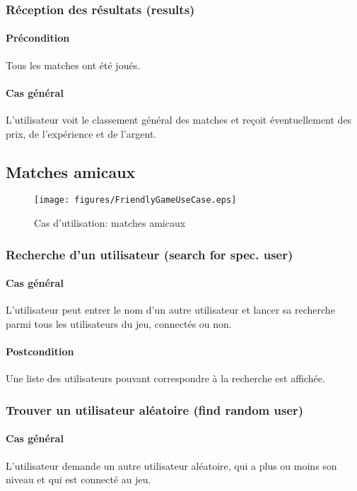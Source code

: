 \subsubsection{Réception des résultats (results)}
	\paragraph{Précondition} Tous les matches ont été joués.
	\paragraph{Cas général} L'utilisateur voit le classement général des matches et reçoit éventuellement des prix, de l'expérience et de l'argent.

\subsection{Matches amicaux}
\begin{figure}[h!]
  \centering
  \texttt{[image: figures/FriendlyGameUseCase.eps]}
  \caption{\label{fig:UC:FriendlyMatch} Cas d'utilisation: matches amicaux}
\end{figure}

\subsubsection{Recherche d'un utilisateur (search for spec. user)}
\paragraph{Cas général} L'utilisateur peut entrer le nom d'un autre utilisateur et lancer sa recherche parmi tous les utilisateurs du jeu, connectés ou non.
\paragraph{Postcondition} Une liste des utilisateurs pouvant correspondre à la recherche est affichée.

\subsubsection{Trouver un utilisateur aléatoire (find random user)}
\paragraph{Cas général} L'utilisateur demande un autre utilisateur aléatoire, qui a plus ou moins son niveau et qui est connecté au jeu.
